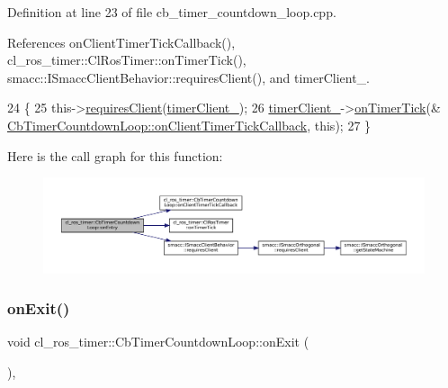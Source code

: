 Definition at line 23 of file cb\+\_\+timer\+\_\+countdown\+\_\+loop.\+cpp.



References on\+Client\+Timer\+Tick\+Callback(), cl\+\_\+ros\+\_\+timer\+::\+Cl\+Ros\+Timer\+::on\+Timer\+Tick(), smacc\+::\+I\+Smacc\+Client\+Behavior\+::requires\+Client(), and timer\+Client\+\_\+.


\begin{DoxyCode}
24 \{
25     this->\hyperlink{classsmacc_1_1ISmaccClientBehavior_a32b16e99e3b4cb289414203dc861a440}{requiresClient}(\hyperlink{classcl__ros__timer_1_1CbTimerCountdownLoop_acca81b8f1807f8e8faf692fb3f9e4dbd}{timerClient\_});
26     \hyperlink{classcl__ros__timer_1_1CbTimerCountdownLoop_acca81b8f1807f8e8faf692fb3f9e4dbd}{timerClient\_}->\hyperlink{classcl__ros__timer_1_1ClRosTimer_a7edcc057bfb5a25fe0892755137dd8da}{onTimerTick}(&
      \hyperlink{classcl__ros__timer_1_1CbTimerCountdownLoop_acb16f3448ad5955bf36e7c2cfd9f691c}{CbTimerCountdownLoop::onClientTimerTickCallback}, \textcolor{keyword}{this});
27 \}
\end{DoxyCode}
Here is the call graph for this function\+:
\nopagebreak
\begin{figure}[H]
\begin{center}
\leavevmode
\includegraphics[width=350pt]{classcl__ros__timer_1_1CbTimerCountdownLoop_aa088f15db4fb2c307c86b30b2e1f7744_cgraph}
\end{center}
\end{figure}
\mbox{\label{classcl__ros__timer_1_1CbTimerCountdownLoop_a5623e9fdd8f0fb23e8707f7816c099d6}} 
\subsubsection{\texorpdfstring{on\+Exit()}{onExit()}}
{\footnotesize\ttfamily void cl\+\_\+ros\+\_\+timer\+::\+Cb\+Timer\+Countdown\+Loop\+::on\+Exit (\begin{DoxyParamCaption}{ }\end{DoxyParamCaption})\hspace{0.3cm}{\ttfamily [override]}, {\ttfamily [virtual]}}



